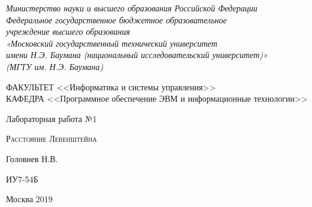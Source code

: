 \documentclass[a4paper,12pt]{article}
\begin{document}

\begin{titlepage}
\newpage

\begin{center}

\textit{Министерство науки и высшего образования Российской Федерации \\ 
Федеральное государственное бюджетное образовательное \\
учреждение высшего образования \\
«Московский государственный технический университет \\
имени Н.Э. Баумана (национальный исследовательский университет)» \\
(МГТУ им. Н.Э. Баумана) \\}
\hrulefill
\end{center}

\vspace{2em}

\begin{flushleft}
ФАКУЛЬТЕТ <<Информатика и системы управления>> \\
\vspace{0.5em}
КАФЕДРА <<Программное обеспечение ЭВМ и информационные технологии>>
\end{flushleft}


\vspace{8em}

\begin{center}
\LARGE Лабораторная работа №1 \\
\end{center}

\vspace{1.5em}

\begin{center}
\textsc{Расстояние Левенштейна}
\end{center}

\vspace{6em}

\begin{center}
Головнев Н.В.

\vspace{4em}

ИУ7-54Б
\end{center}

\vspace{\fill}

\begin{center}
Москва 2019
\end{center}

\end{titlepage}
\end{document}
